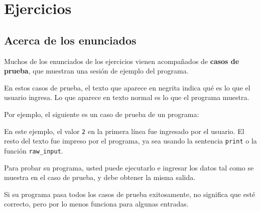 \section{Ejercicios}

\subsection{Acerca de los enunciados}

Muchos de los enunciados de los ejercicios vienen acompañados de
\textbf{casos de prueba}, que muestran una sesión de ejemplo del
programa.

En estos casos de prueba, el texto que aparece en negrita indica qué es
lo que el usuario ingresa. Lo que aparece en texto normal es lo que el
programa muestra.

Por ejemplo, el siguiente es un caso de prueba de un programa:

En este ejemplo, el valor \lstinline!2! en la primera línea fue
ingresado por el usuario. El resto del texto fue impreso por el
programa, ya sea usando la sentencia \lstinline!print! o la función
\lstinline!raw_input!.

Para probar su programa, usted puede ejecutarlo e ingresar los datos tal
como se muestra en el caso de prueba, y debe obtener la misma salida.

Si su programa pasa todos los casos de prueba exitosamente, no significa
que esté correcto, pero por lo menos funciona para algunas entradas.
